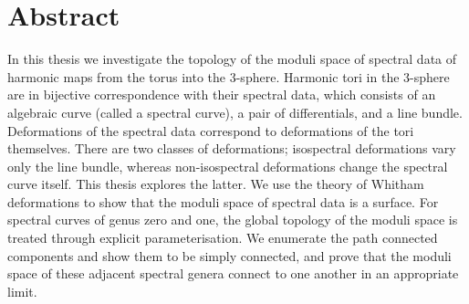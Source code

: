 
\section*{Abstract}
In this thesis we investigate the topology of the moduli space of spectral data of harmonic maps from the torus into the 3-sphere.
Harmonic tori in the 3-sphere are in bijective correspondence with their spectral data, which consists of an algebraic curve (called a spectral curve), a pair of differentials, and a line bundle. Deformations of the spectral data correspond to deformations of the tori themselves. There are two classes of deformations; isospectral deformations vary only the line bundle, whereas non-isospectral deformations change the spectral curve itself.
This thesis explores the latter.
We use the theory of Whitham deformations to show that the moduli space of spectral data is a surface. For spectral curves of genus zero and one, the global topology of the moduli space is treated through explicit parameterisation. We enumerate the path connected components and show them to be simply connected, and prove that the moduli space of these adjacent spectral genera connect to one another in an appropriate limit.
